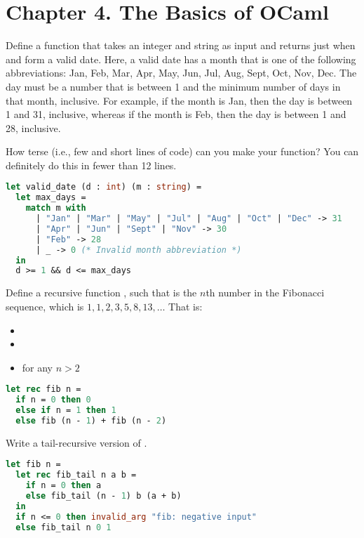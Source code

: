 \section*{Chapter 4. The Basics of OCaml}

Define a function that takes an integer  and string  as input and returns  just when  and  form a valid date. Here, a valid date has a month that is one of the following abbreviations: Jan, Feb, Mar, Apr, May, Jun, Jul, Aug, Sept, Oct, Nov, Dec. The day must be a number that is between 1 and the minimum number of days in that month, inclusive. For example, if the month is Jan, then the day is between 1 and 31, inclusive, whereas if the month is Feb, then the day is between 1 and 28, inclusive.

How terse (i.e., few and short lines of code) can you make your function? You can definitely do this in fewer than 12 lines.

\begin{lstlisting}[language=OCaml]
let valid_date (d : int) (m : string) =
  let max_days =
    match m with
      | "Jan" | "Mar" | "May" | "Jul" | "Aug" | "Oct" | "Dec" -> 31
      | "Apr" | "Jun" | "Sept" | "Nov" -> 30
      | "Feb" -> 28
      | _ -> 0 (* Invalid month abbreviation *)
  in
  d >= 1 && d <= max_days
\end{lstlisting}

\problem[fib]
Define a recursive function , such that  is the $n$th number in the Fibonacci sequence,
which is $1, 1, 2, 3, 5, 8, 13, \ldots$ That is:
\begin{itemize}
  \item {}
  \item {}
  \item {} for any $n > 2$
\end{itemize}

\begin{lstlisting}[language=OCaml]
let rec fib n =
  if n = 0 then 0
  else if n = 1 then 1
  else fib (n - 1) + fib (n - 2)
\end{lstlisting}

Write a tail-recursive version of .

\begin{lstlisting}[language=OCaml]
let fib n =
  let rec fib_tail n a b =
    if n = 0 then a
    else fib_tail (n - 1) b (a + b)
  in
  if n <= 0 then invalid_arg "fib: negative input"
  else fib_tail n 0 1
\end{lstlisting}

